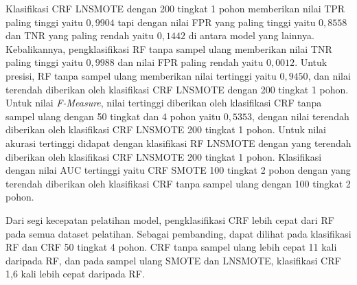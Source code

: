 Klasifikasi CRF LNSMOTE dengan 200 tingkat 1 pohon memberikan nilai TPR paling
tinggi yaitu $0,9904$ tapi dengan nilai FPR yang paling tinggi yaitu $0,8558$
dan TNR yang paling rendah yaitu $0,1442$ di antara model yang lainnya.
Kebalikannya, pengklasifikasi RF tanpa sampel ulang memberikan nilai TNR paling
tinggi yaitu $0,9988$ dan nilai FPR paling rendah yaitu $0,0012$.
Untuk presisi, RF tanpa sampel ulang memberikan nilai tertinggi yaitu $0,9450$,
dan nilai terendah diberikan oleh klasifikasi CRF LNSMOTE dengan 200 tingkat 1
pohon.
Untuk nilai \textit{F-Measure}, nilai tertinggi diberikan oleh klasifikasi CRF
tanpa sampel ulang dengan 50 tingkat dan 4 pohon yaitu $0,5353$, dengan nilai
terendah diberikan oleh klasifikasi CRF LNSMOTE 200 tingkat 1 pohon.
Untuk nilai akurasi tertinggi didapat dengan klasifikasi RF LNSMOTE dengan
yang terendah diberikan oleh klasifikasi CRF LNSMOTE 200 tingkat 1 pohon.
Klasifikasi dengan nilai AUC tertinggi yaitu CRF SMOTE 100 tingkat 2 pohon
dengan yang terendah diberikan oleh klasifikasi CRF tanpa sampel ulang dengan
100 tingkat 2 pohon.

Dari segi kecepatan pelatihan model, pengklasifikasi CRF lebih cepat dari RF
pada semua dataset pelatihan.
Sebagai pembanding, dapat dilihat pada klasifikasi RF dan CRF 50 tingkat 4
pohon.
CRF tanpa sampel ulang lebih cepat 11 kali daripada RF, dan pada sampel ulang
SMOTE dan LNSMOTE, klasifikasi CRF 1,6 kali lebih cepat daripada RF.
